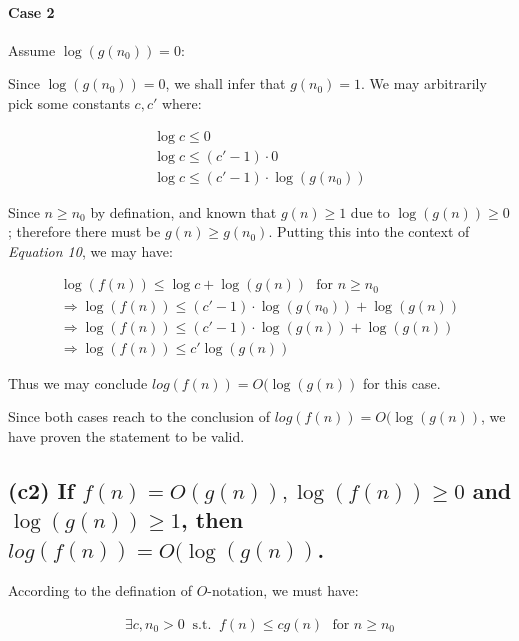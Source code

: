 \documentclass[12pt]{article}
\begin{document}
\paragraph{Case 2} Assume $\log (g(n_{0})) = 0$:

Since $\log (g(n_{0})) = 0$, we shall infer that $g(n_{0}) = 1$. We may arbitrarily pick some constants $c, c'$ where:

\begin{gather}
    \log c \leq 0 \nonumber\\
    \log c \leq (c' - 1) \cdot 0 \nonumber\\
    \log c \leq (c' - 1) \cdot \log(g(n_{0}))
\end{gather}

Since $n \geq n_{0}$ by defination, and known that $g(n) \geq 1$ due to $\log(g(n)) \geq 0$; therefore there must be $g(n) \geq g(n_{0})$. Putting this into the context of \textit{Equation 10}, we may have:

\begin{gather}
    \log(f(n)) \leq \log c + \log(g(n)) \ \ \ \text{for $n \geq n_{0}$} \nonumber \\
    \Rightarrow \log(f(n)) \leq (c' - 1) \cdot \log(g(n_{0})) + \log(g(n)) \nonumber \\
    \Rightarrow \log(f(n)) \leq (c' - 1) \cdot \log(g(n)) + \log(g(n)) \nonumber \\
    \Rightarrow \log(f(n)) \leq c'\log(g(n))
\end{gather}

Thus we may conclude $log(f(n)) = O(\log(g(n))$ for this case.\newline

Since both cases reach to the conclusion of $log(f(n)) = O(\log(g(n))$, we have proven the statement to be valid.



\subsection{(c2) If $f(n) = O(g(n)), \log(f(n)) \geq 0$ and $\log(g(n)) \geq 1$, then $log(f(n)) = O(\log(g(n))$.}



According to the defination of $O$-notation, we must have:

\begin{gather}
    \exists c, n_{0} > 0 \ \text{ s.t. } \ f(n) \leq cg(n) \ \ \ \text{for $n \geq n_{0}$}
\end{gather}
\end{document}

